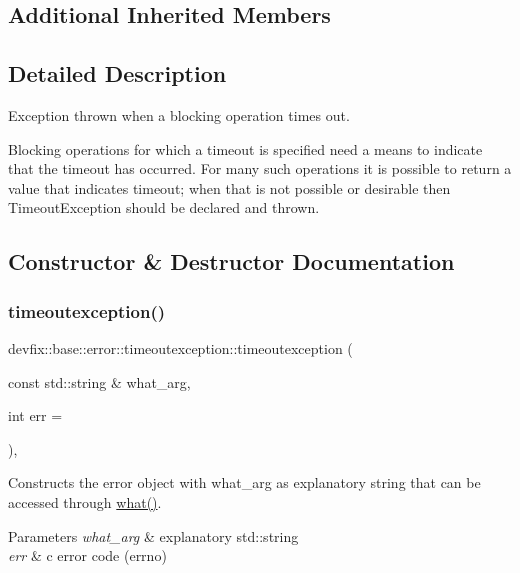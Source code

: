\subsection*{Additional Inherited Members}


\subsection{Detailed Description}
Exception thrown when a blocking operation times out. 

Blocking operations for which a timeout is specified need a means to indicate that the timeout has occurred. For many such operations it is possible to return a value that indicates timeout; when that is not possible or desirable then Timeout\+Exception should be declared and thrown. 

\subsection{Constructor \& Destructor Documentation}
\mbox{\label{structdevfix_1_1base_1_1error_1_1timeoutexception_a1795157a577b45e026b11c3b3cec80b3}} 
\subsubsection{\texorpdfstring{timeoutexception()}{timeoutexception()}\hspace{0.1cm}{\footnotesize\ttfamily [1/2]}}
{\footnotesize\ttfamily devfix\+::base\+::error\+::timeoutexception\+::timeoutexception (\begin{DoxyParamCaption}\item[{const std\+::string \&}]{what\+\_\+arg,  }\item[{int}]{err = {} }\end{DoxyParamCaption})\hspace{0.3cm}{\ttfamily [inline]}, {\ttfamily [explicit]}}

Constructs the error object with what\+\_\+arg as explanatory string that can be accessed through \hyperlink{structdevfix_1_1base_1_1error_1_1baseexception_a16327152a55d65b1e537825231fbd452}{what()}. 
\begin{DoxyParams}{Parameters}
{\em what\+\_\+arg} & explanatory std\+::string \\
\hline
{\em err} & c error code (errno) \\
\hline
\end{DoxyParams}
\mbox{\label{structdevfix_1_1base_1_1error_1_1timeoutexception_ac35d347533a4a8ba1d19900846784e72}} 
